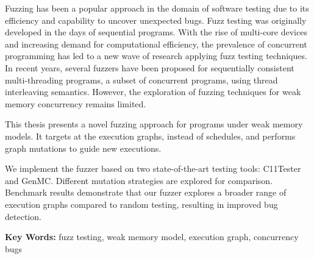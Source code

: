 
Fuzzing has been a popular approach in the domain of software testing due to its efficiency and capability to uncover  unexpected bugs. Fuzz testing was originally developed in the days of sequential programs. With the rise of multi-core devices and increasing demand for computational efficiency, the prevalence of concurrent programming has led to a new wave of research applying fuzz testing techniques. In recent years, several fuzzers have been proposed for sequentially consistent multi-threading programs, a subset of concurrent programs, using thread interleaving semantics. However, the exploration of fuzzing techniques for weak memory concurrency remains limited.

This thesis presents a novel fuzzing approach for programs under weak memory models. It targets at the execution graphs, instead of schedules, and performs graph mutations to guide new executions.

We implement the fuzzer based on two state-of-the-art testing tools: C11Tester and GenMC. Different mutation strategies are explored for comparison. Benchmark results demonstrate that our fuzzer explores a broader range of execution graphs compared to random testing, resulting in improved bug detection.

\textbf{Key Words:} fuzz testing, weak memory model, execution graph, concurrency bugs

